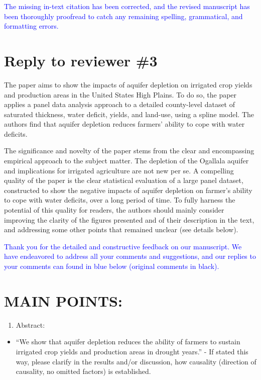 \documentclass[
]{article}
\providecommand{\tightlist}{%
  \setlength{\itemsep}{0pt}\setlength{\parskip}{0pt}}
\begin{document}
\textcolor{blue}{The missing in-text citation has been corrected, and the revised manuscript has been thoroughly proofread to catch any remaining spelling, grammatical, and formatting errors.}


\section{Reply to reviewer \#3}


The paper aims to show the impacts of aquifer depletion on irrigated
crop yields and production areas in the United States High Plains. To do
so, the paper applies a panel data analysis approach to a detailed
county-level dataset of saturated thickness, water deficit, yields, and
land-use, using a spline model. The authors find that aquifer depletion
reduces farmers' ability to cope with water deficits.

The significance and novelty of the paper stems from the clear and
encompassing empirical approach to the subject matter. The depletion of
the Ogallala aquifer and implications for irrigated agriculture are not
new per se. A compelling quality of the paper is the clear statistical
evaluation of a large panel dataset, constructed to show the negative
impacts of aquifer depletion on farmer's ability to cope with water
deficits, over a long period of time. To fully harness the potential of
this quality for readers, the authors should mainly consider improving
the clarity of the figures presented and of their description in the
text, and addressing some other points that remained unclear (see
details below).

\textcolor{blue}{Thank you for the detailed and constructive feedback on our manuscript. We have endeavored to address all your comments and suggestions, and our replies to your comments can found in blue below (original comments in black).}

\hypertarget{main-points}{%
\section{MAIN POINTS:}\label{main-points}}

\begin{enumerate}
\def\labelenumi{\arabic{enumi}.}
\tightlist
\item
  Abstract:
\end{enumerate}

\begin{itemize}
\tightlist
\item
  ``We show that aquifer depletion reduces the ability of farmers to
  sustain irrigated crop yields and production areas in drought years.''
  - If stated this way, please clarify in the results and/or discussion,
  how causality (direction of causality, no omitted factors) is
  established.
\end{itemize}
\end{document}
